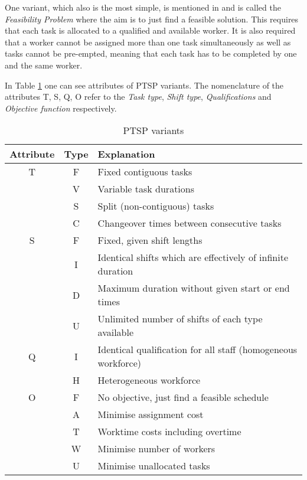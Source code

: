 One variant, which also is the most simple, is mentioned in \cite{krishnamoorthy_2001} and is called the \textit{Feasibility Problem} where the aim is to just find a feasible solution. This requires that each task is allocated to a qualified and available worker. It is also required that a worker cannot be assigned more than one task simultaneously as well as tasks cannot be pre-empted, meaning that each task has to be completed by one and the same worker.

In Table \ref{PTSP} one can see attributes of PTSP variants. The nomenclature of the attributes T, S, Q, O refer to the \textit{Task type}, \textit{Shift type}, \textit{Qualifications} and \textit{Objective function} respectively. 
\begin{table}[H]
\caption{PTSP variants}
\label{PTSP}
\begin{tabular}{|c|c|l|}
\hline
\textbf{Attribute} & \textbf{Type} & \textbf{Explanation} \\ \hline
T & F & Fixed contiguous tasks \\
& V & Variable task durations \\
& S & Split (non-contiguous) tasks \\
& C & Changeover times between consecutive tasks \\
\hline 
S & F & Fixed, given shift lengths \\
& I & Identical shifts which are effectively of infinite duration \\
& D & Maximum duration without given start or end times \\
& U & Unlimited number of shifts of each type available \\
\hline 
Q & I & Identical qualification for all staff (homogeneous workforce) \\
& H & Heterogeneous workforce \\
\hline 
O & F & No objective, just find a feasible schedule \\
& A & Minimise assignment cost \\
& T & Worktime costs including overtime \\
& W & Minimise number of workers \\
& U & Minimise unallocated tasks \\
\hline  

\end{tabular}
\end{table}

